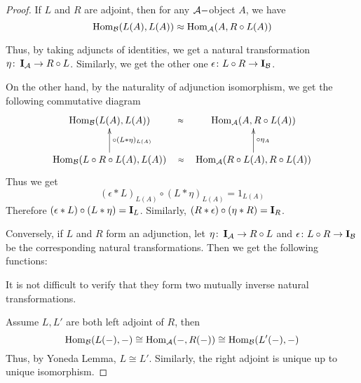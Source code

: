   \begin{proof}
    If $L$ and $R$ are adjoint, then for any ${\cal A}-$object $A$, we have
    \begin{equation*}
      \operatorname{Hom}_{{\cal B}}(L(A),L(A))\approx\operatorname{Hom}_{{\cal A}}(A,R\circ L(A))
    \end{equation*}

    Thus, by taking adjuncts of identities, we get a natural transformation $\eta\colon\operatorname{\mathbf{I}}_{{\cal A}} \to R \circ L$. Similarly, we get the other one $\epsilon\colon L \circ R \to \operatorname{\mathbf{I}}_{{\cal B}}$.

    On the other hand, by the naturality of  adjunction isomorphism, we get the following commutative diagram
    \begin{displaymath}
      \xymatrix{
        \Hom_{\Bb}(L(A),L(A))&\Hom_{\Aa}(A,R\circ L(A))\ar@{}[l]|-{\approx}\\
        \Hom_{\Bb}(L\circ R\circ L(A),L(A))\ar[u]_{\circ(L\ast\eta)_{L(A)}}
        &\Hom_{\Aa}(R\circ L(A),R\circ L(A))\ar[u]_{\circ\eta_A}\ar@{}[l]|-{\approx}
        }
    \end{displaymath}
    Thus we get
    \begin{equation*}
      (\epsilon\ast L)_{L(A)}\circ(L\ast\eta)_{L(A)} = 1_{L(A)}
    \end{equation*}
    Therefore
    $(\epsilon\ast L)\circ(L\ast\eta) = \operatorname{\mathbf{I}}_L$.
    Similarly, $(R\ast \epsilon)\circ(\eta\ast R) = \operatorname{\mathbf{I}}_R$.

    Conversely, if $L$ and $R$ form an adjunction, let $\eta\colon\operatorname{\mathbf{I}}_{{\cal A}} \to R \circ L$ and $\epsilon\colon L \circ R \to \operatorname{\mathbf{I}}_{{\cal B}}$ be the corresponding natural transformations. Then we get the following functions:

    It is not difficult to verify that they form two mutually inverse natural transformations.

    Assume $L,L'$ are both left adjoint of $R$, then
    \begin{equation*}
      \operatorname{Hom}_{{\cal B}}(L(-),-)\cong\operatorname{Hom}_{{\cal A}}(-,R(-))\cong\operatorname{Hom}_{{\cal B}}(L'(-),-)
    \end{equation*}
    Thus, by Yoneda Lemma, $L\cong L'$. Similarly, the right adjoint is unique up to unique isomorphism.
  \end{proof}

